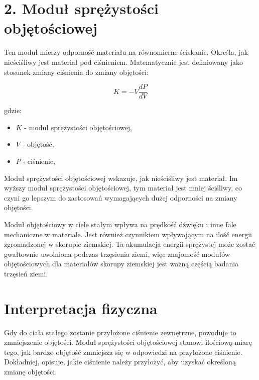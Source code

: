 {}
\justify
\fontsize{14}{16}\selectfont
\setlength{\parindent}{0pt}
\section*{2. Moduł sprężystości objętościowej \cite{alma991000389799708832, hyperphysics_url}} 
\fontsize{12}{14}\selectfont

\hspace{1.5cm} Ten moduł mierzy odporność materiału na równomierne ściskanie. 
Określa, jak nieściśliwy jest materiał pod ciśnieniem. 
Matematycznie jest definiowany jako stosunek zmiany ciśnienia do zmiany objętości:

$$
K = -V \frac{dP}{dV}
$$

gdzie:
\begin{itemize}
    \item  $K$ - moduł sprężystości objętościowej,
    \item  $V$ - objętość,
    \item  $P$ - ciśnienie,
\end{itemize}

\hspace{1.5cm} Moduł sprężystości objętościowej wskazuje, jak nieściśliwy jest materiał. Im wyższy moduł sprężystości objętościowej, tym materiał jest mniej ściśliwy, co czyni go lepszym do zastosowań wymagających dużej odporności na zmiany objętości.

\hspace{1.5cm} Moduł objętościowy w ciele stałym wpływa na prędkość dźwięku i inne fale mechaniczne w materiale. Jest również czynnikiem wpływającym na ilość energii zgromadzonej w skorupie ziemskiej. Ta akumulacja energii sprężystej może zostać gwałtownie uwolniona podczas trzęsienia ziemi, więc znajomość modułów objętościowych dla materiałów skorupy ziemskiej jest ważną częścią badania trzęsień ziemi. 
{}
\section*{Interpretacja fizyczna \cite{alma991000386409708832}}
\vspace{-1.0em}
\hspace{1.5cm} Gdy do ciała stałego zostanie przyłożone ciśnienie zewnętrzne, powoduje to zmniejszenie objętości. Moduł sprężystości objętościowej stanowi ilościową miarę tego, jak bardzo objętość zmniejsza się w odpowiedzi na przyłożone ciśnienie. Dokładniej, opisuje, jakie ciśnienie należy przyłożyć, aby uzyskać określoną zmianę objętości.

